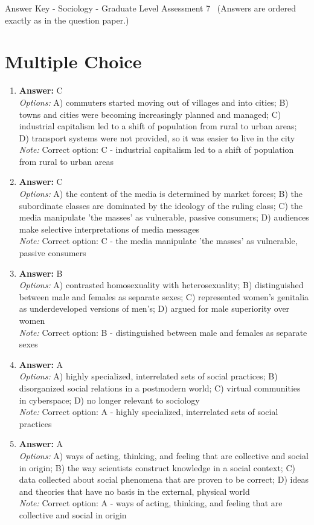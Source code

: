 \documentclass[12pt]{article}
\begin{document}
\begin{center}
Answer Key - Sociology - Graduate Level Assessment 7 \
\small (Answers are ordered exactly as in the question paper.)
\end{center}

\section*{Multiple Choice}
\begin{enumerate}[label=\arabic*.]
\item \textbf{Answer:} C
\\ \textit{Options:} A) commuters started moving out of villages and into cities; B) towns and cities were becoming increasingly planned and managed; C) industrial capitalism led to a shift of population from rural to urban areas; D) transport systems were not provided, so it was easier to live in the city
\\ \textit{Note:} Correct option: C - industrial capitalism led to a shift of population from rural to urban areas
\item \textbf{Answer:} C
\\ \textit{Options:} A) the content of the media is determined by market forces; B) the subordinate classes are dominated by the ideology of the ruling class; C) the media manipulate 'the masses' as vulnerable, passive consumers; D) audiences make selective interpretations of media messages
\\ \textit{Note:} Correct option: C - the media manipulate 'the masses' as vulnerable, passive consumers
\item \textbf{Answer:} B
\\ \textit{Options:} A) contrasted homosexuality with heterosexuality; B) distinguished between male and females as separate sexes; C) represented women's genitalia as underdeveloped versions of men's; D) argued for male superiority over women
\\ \textit{Note:} Correct option: B - distinguished between male and females as separate sexes
\item \textbf{Answer:} A
\\ \textit{Options:} A) highly specialized, interrelated sets of social practices; B) disorganized social relations in a postmodern world; C) virtual communities in cyberspace; D) no longer relevant to sociology
\\ \textit{Note:} Correct option: A - highly specialized, interrelated sets of social practices
\item \textbf{Answer:} A
\\ \textit{Options:} A) ways of acting, thinking, and feeling that are collective and social in origin; B) the way scientists construct knowledge in a social context; C) data collected about social phenomena that are proven to be correct; D) ideas and theories that have no basis in the external, physical world
\\ \textit{Note:} Correct option: A - ways of acting, thinking, and feeling that are collective and social in origin
\end{enumerate}
\end{document}
